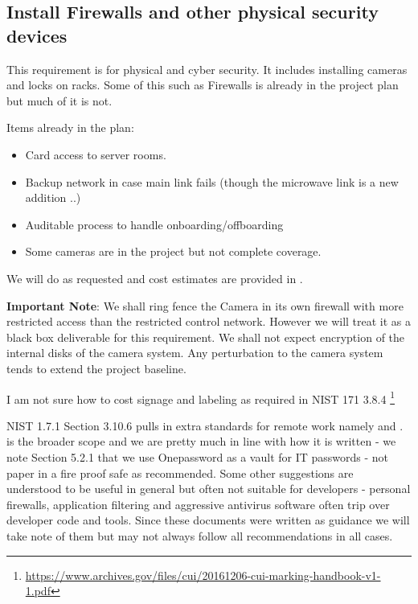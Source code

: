 
\subsection{Install Firewalls and other physical security devices} \label{sec:2firewalls}

This requirement is for physical and cyber security. It includes installing cameras and locks on racks.
Some of this such as Firewalls is already in the project plan but much of it is not.

Items already in the plan:
\begin{itemize}
\item Card access to server rooms.
\item Backup network in case main link fails (though the microwave link is a new addition ..)
\item Auditable process to handle onboarding/offboarding
\item Some cameras are in the project but not complete coverage.

\end{itemize}

We will do as requested and cost estimates are provided in .

{\bf Important Note}: We shall ring fence the Camera in its own firewall with more restricted access than the restricted control network.
However we will treat it as a black box deliverable for this requirement. We shall not expect encryption of the internal disks of the camera system. Any perturbation to the camera system tends to extend the project baseline.

I am not sure how to cost signage and labeling as required in NIST 171 3.8.4 \footnote{\url{https://www.archives.gov/files/cui/20161206-cui-marking-handbook-v1-1.pdf}}

NIST 1.7.1 Section 3.10.6 pulls in extra standards for remote work namely  and .
 is the broader scope and we are pretty much in line with how it is written - we note Section 5.2.1 that we use Onepassword as a vault for IT passwords - not paper in a fire proof safe as recommended.
Some other suggestions are understood to be useful in general but often not suitable for developers - personal firewalls, application filtering  and aggressive antivirus software often trip over developer code and tools.
Since these documents were written  as guidance we will take note of them but may not always follow all recommendations in all cases.


